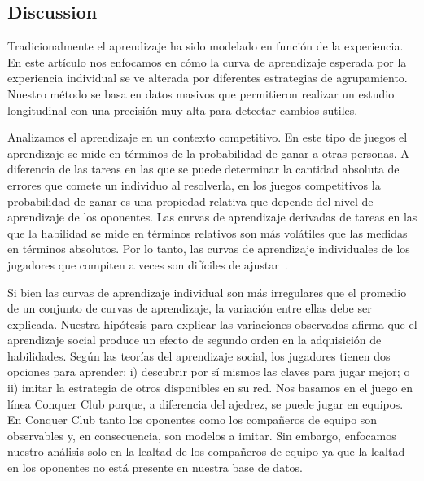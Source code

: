 \documentclass[a4paper,10pt]{book}
\theoremstyle{definition}
\begin{document}
\subsection{Discussion}

Tradicionalmente el aprendizaje ha sido modelado en función de la experiencia.
%
En este artículo nos enfocamos en cómo la curva de aprendizaje esperada por la experiencia individual se ve alterada por diferentes estrategias de agrupamiento.
%
Nuestro método se basa en datos masivos que permitieron realizar un estudio longitudinal con una precisión muy alta para detectar cambios sutiles.


Analizamos el aprendizaje en un contexto competitivo.
%
En este tipo de juegos el aprendizaje se mide en términos de la probabilidad de ganar a otras personas.
%
A diferencia de las tareas en las que se puede determinar la cantidad absoluta de errores que comete un individuo al resolverla, en los juegos competitivos la probabilidad de ganar es una propiedad relativa que depende del nivel de aprendizaje de los oponentes.
%
Las curvas de aprendizaje derivadas de tareas en las que la habilidad se mide en términos relativos son más volátiles que las medidas en términos absolutos.
%
Por lo tanto, las curvas de aprendizaje individuales de los jugadores que compiten a veces son difíciles de ajustar~\cite{howard2014-learningCurvesChessPlayersATestOfPowerLawGenerality,gaschler2014-playingOffThePredictedLearningCurve}.


Si bien las curvas de aprendizaje individual son más irregulares que el promedio de un conjunto de curvas de aprendizaje, la variación entre ellas debe ser explicada.
%
Nuestra hipótesis para explicar las variaciones observadas afirma que el aprendizaje social produce un efecto de segundo orden en la adquisición de habilidades.
%
Seg\'un las teorías del aprendizaje social, los jugadores tienen dos opciones para aprender: i) descubrir por sí mismos las claves para jugar mejor; o ii) imitar la estrategia de otros disponibles en su red.
%
Nos basamos en el juego en línea Conquer Club porque, a diferencia del ajedrez, se puede jugar en equipos.
%
En Conquer Club tanto los oponentes como los compañeros de equipo son observables y, en consecuencia, son modelos a imitar.
%
Sin embargo, enfocamos nuestro análisis solo en la lealtad de los compañeros de equipo ya que la lealtad en los oponentes no está presente en nuestra base de datos.
\end{document}
